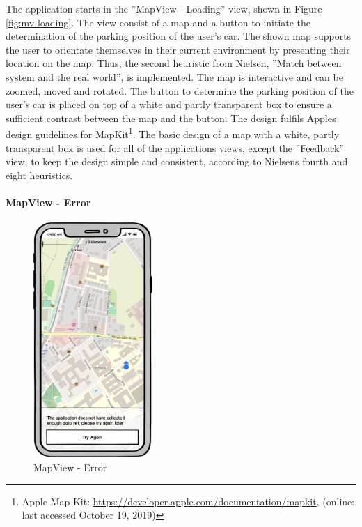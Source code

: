 The application starts in the ''MapView - Loading'' view, shown in Figure \ref{fig:mv-loading}. The view consist of a map and a button to initiate the determination of the parking position of the user's car. The shown map supports the user to orientate themselves in their current environment by presenting their location on the map. Thus, the second heuristic from Nielsen, ''Match between system and the real world'', is implemented. The map is interactive and can be zoomed, moved and rotated. The button to determine the parking position of the user's car is placed on top of a white and partly transparent box to ensure a sufficient contrast between the map and the button. The design fulfils Apples design guidelines for MapKit\footnote{Apple Map Kit: \url{https://developer.apple.com/documentation/mapkit}, (online: last accessed October 19, 2019) }. The basic design of a map with a white, partly transparent box is used for all of the applications views, except the ''Feedback'' view, to keep the design simple and consistent, according to Nielsens fourth and eight heuristics. \cite{nielsen1994usability} \cite{apple:interfaceguidliines}

\newpage

\paragraph{MapView - Error}

\begin{figure}[h]
    \centering
    \includegraphics[width=0.4\textwidth]{images/UI/Iteration4-MapView-Error.png}
    \caption{MapView - Error}
    \label{fig:mv-error}
\end{figure}

